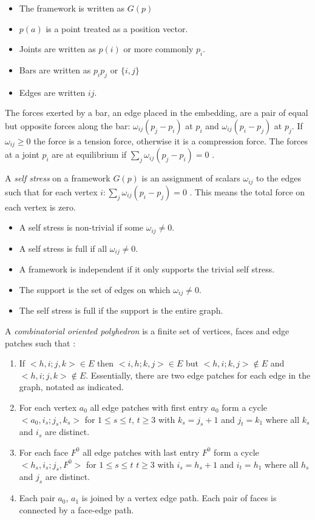 \documentclass[11pt]{article}
\theoremstyle{definition}
\begin{document}
\begin{itemize}
	\item The framework is written as $G(p)$
	\item $p(a)$ is a point treated as a position vector. 
	\item Joints are written as $p(i)$ or more commonly $p_i$.
	\item Bars are written as $p_ip_j$ or $\{i,j\}$
	\item Edges are written $ij$.
\end{itemize}

The forces exerted by a bar, an edge placed in the embedding, are a pair of equal but opposite forces along the bar: $\omega_{ij}(p_j - p_i)$ at $p_i$ and $\omega_{ij}(p_i - p_j)$ at $p_j$. If $\omega_{ij} \geq 0$ the force is a tension force, otherwise it is a compression force. The forces at a joint $p_i$ are at equilibrium if $\sum_j \omega_{ij}(p_j-p_i) = 0$ \cite{mccProof}.

A \emph{self stress} on a framework $G(p)$ is an assignment of scalars $\omega_{ij}$ to the edges such that for each vertex $i : \sum_j \omega_{ij}(p_i - p_j) = 0$ \cite{mccProof}. This means the total force on each vertex is zero. 
\begin{itemize}
	\item A self stress is non-trivial if some $\omega_{ij} \neq 0$.
	\item A self stress is full if all $\omega_{ij} \neq 0$.
	\item A framework is independent if it only supports the trivial self stress.
	\item The support is the set of edges on which $\omega_{ij} \neq 0$.
	\item The self stress is full if the support is the entire graph.
\end{itemize}

A \emph{combinatorial oriented polyhedron} is a finite set of vertices, faces and edge patches such that \cite{mccProof}:
\begin{enumerate}
	\item If $<h,i;j,k> \in E$ then $<i,h;k,j> \in E$ but $<h,i;k,j> \not\in E$ and $<h,i;j,k> \not\in E$. Essentially, there are two edge patches for each edge in the graph, notated as indicated.
	\item For each vertex $a_0$ all edge patches with first entry $a_0$ form a cycle $<a_0,i_s;j_s,k_s>$ for $1\leq s \leq t$, $t\geq3$ with $k_s = j_s + 1$ and $j_t = k_1$ where all $k_s$ and $i_s$ are distinct. 
	\item For each face $F^0$ all edge patches with last entry $F^0$ form a cycle $<h_s, i_s;j_s,F^0>$ for $1\leq s \leq t$ $t\geq3$ with $i_s = h_s + 1$ and $i_t = h_1$ where all $h_s$ and $j_s$ are distinct.
	\item Each pair $a_0$, $a_1$ is joined by a vertex edge path. Each pair of faces is connected by a face-edge path. 
\end{enumerate}
\end{document}
